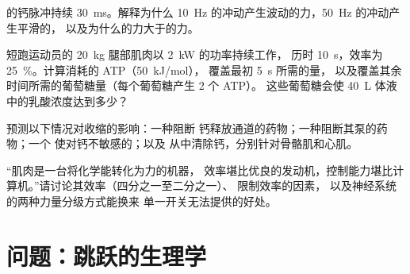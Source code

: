 \begin{exercise}[$\star\star$]\label{exo:b2:muscle-movement:9}
的钙脉冲持续 \qty{30}{ms}。解释为什么
\qty{10}{Hz} 的冲动产生波动的力，\qty{50}{Hz} 的冲动产生平滑的，
以及为什么的力大于的力。
\end{exercise}

\begin{exercise}[$\star\star\star$]\label{exo:b2:muscle-movement:10}
短跑运动员的 \qty{20}{kg} 腿部肌肉以 \qty{2}{kW} 的功率持续工作，
历时 \qty{10}{s}，效率为 \qty{25}{\%}。计算消耗的 ATP（\qty{50}{kJ/mol}），
覆盖最初 \qty{5}{s} 所需的量，
以及覆盖其余时间所需的葡萄糖量（每个葡萄糖产生 2 个 ATP）。
这些葡萄糖会使 \qty{40}{L} 体液中的乳酸浓度达到多少？
\end{exercise}

\begin{exercise}[$\star\star\star$]\label{exo:b2:muscle-movement:11}
预测以下情况对收缩的影响：一种阻断
钙释放通道的药物；一种阻断其泵的药物；一个
使对钙不敏感的；以及
从中清除钙，分别针对骨骼肌和心肌。
\end{exercise}

\begin{exercise}[$\star\star\star$]\label{exo:b2:muscle-movement:12}
“肌肉是一台将化学能转化为力的机器，
效率堪比优良的发动机，控制能力堪比计算机。”请讨论其效率（四分之一至二分之一）、
限制效率的因素，
以及神经系统的两种力量分级方式能换来
单一开关无法提供的好处。
\end{exercise}

\section{问题：跳跃的生理学}


